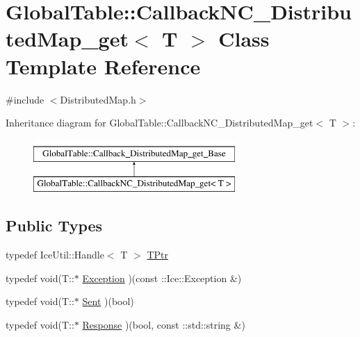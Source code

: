 \hypertarget{class_global_table_1_1_callback_n_c___distributed_map__get}{
\section{GlobalTable::CallbackNC\_\-DistributedMap\_\-get$<$ T $>$ Class Template Reference}
\label{class_global_table_1_1_callback_n_c___distributed_map__get}
}


{\ttfamily \#include $<$DistributedMap.h$>$}

Inheritance diagram for GlobalTable::CallbackNC\_\-DistributedMap\_\-get$<$ T $>$:\begin{figure}[H]
\begin{center}
\leavevmode
\includegraphics[height=2cm]{class_global_table_1_1_callback_n_c___distributed_map__get}
\end{center}
\end{figure}
\subsection*{Public Types}
\begin{DoxyCompactItemize}
\item 
typedef IceUtil::Handle$<$ T $>$ \hyperlink{class_global_table_1_1_callback_n_c___distributed_map__get_a292c63a092a90c360da327d6157fb137}{TPtr}
\item 
typedef void(T::$\ast$ \hyperlink{class_global_table_1_1_callback_n_c___distributed_map__get_a126db6802d2d4a7493339ff578a55dbd}{Exception} )(const ::Ice::Exception \&)
\item 
typedef void(T::$\ast$ \hyperlink{class_global_table_1_1_callback_n_c___distributed_map__get_adafce4dc5804233cd3b7653cf69f5be6}{Sent} )(bool)
\item 
typedef void(T::$\ast$ \hyperlink{class_global_table_1_1_callback_n_c___distributed_map__get_a6b02991617c30d649770987cc7d959d9}{Response} )(bool, const ::std::string \&)
\end{DoxyCompactItemize}

